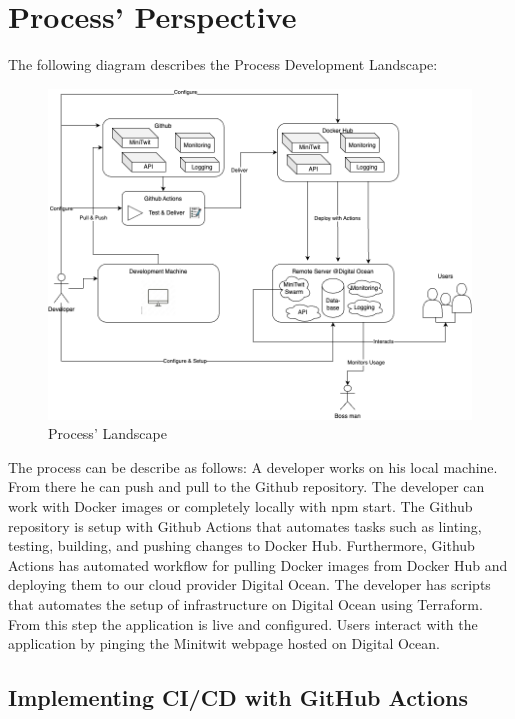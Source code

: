 \documentclass[11pt]{article}
\begin{document}
\section{Process' Perspective}
The following diagram describes the Process Development Landscape:
\begin{figure}[!h]
    \centering
    \includegraphics[width=\textwidth]{images/process.png}
    \caption{Process' Landscape}
    \label{fig:process-overview}
\end{figure}

The process can be describe as follows: A developer works on his local machine. From there he can push and pull to the Github repository. The developer can work with Docker images or completely locally with npm start. The Github repository is setup with Github Actions that automates tasks such as linting, testing, building, and pushing changes to Docker Hub. Furthermore, Github Actions has automated workflow for pulling Docker images from Docker Hub and deploying them to our cloud provider Digital Ocean. The developer has scripts that automates the setup of infrastructure on Digital Ocean using Terraform. From this step the application is live and configured. Users interact with the application by pinging the Minitwit webpage hosted on Digital Ocean. 

\subsection{Implementing CI/CD with GitHub Actions}
\end{document}
